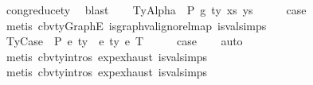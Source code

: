 \begin{isabellebody}
\ cong{\isacharunderscore}{\kern0pt}reduce{\isacharunderscore}{\kern0pt}ty\ \isamarkupfalse%
\ blast\isanewline
{}\isamarkupfalse%
\isanewline
\ \ \isamarkupfalse%
\ {\isacharparenleft}{\kern0pt}TyAlpha\ {\isasymGamma}{}\ P\ g\ ty\ xs\ ys{\isacharparenright}{\kern0pt}\isanewline
\ \ \isamarkupfalse%
\ \isamarkupfalse%
\ {\isacharquery}{\kern0pt}case\isanewline
\ \ \isamarkupfalse%
\ {\isacharparenleft}{\kern0pt}metis\ cbv{\isacharunderscore}{\kern0pt}ty{\isacharunderscore}{\kern0pt}GraphE\ is{\isacharunderscore}{\kern0pt}graph{\isacharunderscore}{\kern0pt}val{\isacharunderscore}{\kern0pt}ignore{\isacharunderscore}{\kern0pt}lmap\ is{\isacharunderscore}{\kern0pt}val{\isachardot}{\kern0pt}simps{\isacharparenleft}{\kern0pt}{}{\isacharparenright}{\kern0pt}{\isacharparenright}{\kern0pt}\isanewline
{}\isamarkupfalse%
\isanewline
\ \ \isamarkupfalse%
\ {\isacharparenleft}{\kern0pt}TyCase\ {\isasymGamma}\ P\ e{}\ ty{}\ {\isasymGamma}{}\ e{}\ ty{}\ e{}\ T{\isacharparenright}{\kern0pt}\isanewline
\ \ \isamarkupfalse%
\ \isamarkupfalse%
\ {\isacharquery}{\kern0pt}case\isanewline
\ \ \isamarkupfalse%
\ auto\isanewline
\ \ \isamarkupfalse%
\ {\isacharparenleft}{\kern0pt}metis\ cbv{\isacharunderscore}{\kern0pt}ty{\isachardot}{\kern0pt}intros{\isacharparenleft}{\kern0pt}{}{\isacharparenright}{\kern0pt}\ exp{\isachardot}{\kern0pt}exhaust\ is{\isacharunderscore}{\kern0pt}val{\isachardot}{\kern0pt}simps{\isacharparenleft}{\kern0pt}{}{\isacharcomma}{\kern0pt}{}{\isacharcomma}{\kern0pt}{}{\isacharparenright}{\kern0pt}{\isacharparenright}{\kern0pt}\isanewline
\ \ \isamarkupfalse%
\ {\isacharparenleft}{\kern0pt}metis\ cbv{\isacharunderscore}{\kern0pt}ty{\isachardot}{\kern0pt}intros{\isacharparenleft}{\kern0pt}{}{\isacharparenright}{\kern0pt}\ exp{\isachardot}{\kern0pt}exhaust\ is{\isacharunderscore}{\kern0pt}val{\isachardot}{\kern0pt}simps{\isacharparenleft}{\kern0pt}{}{\isacharcomma}{\kern0pt}{}{\isacharcomma}{\kern0pt}{}{\isacharparenright}{\kern0pt}{\isacharparenright}{\kern0pt}\isanewline
{}\isamarkupfalse%
%
\endisatagproof
{\isafoldproof}%
%
\isadelimproof
%
\endisadelimproof
%
\begin{isamarkuptext}%

\end{isamarkuptext}
\end{isabellebody}
